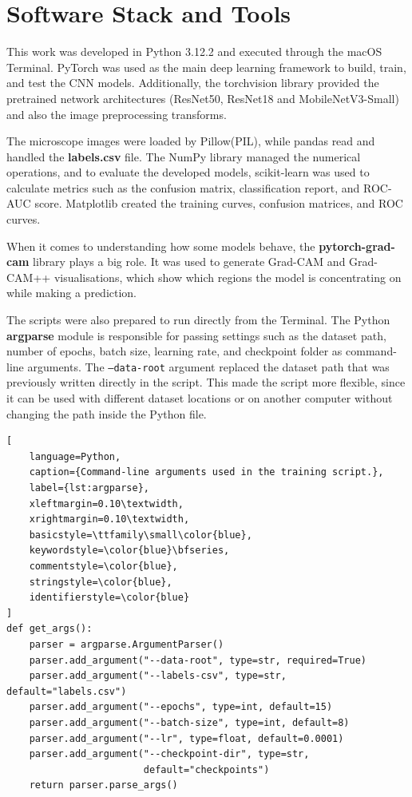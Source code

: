 \section{Software Stack and Tools}

This work was developed in Python 3.12.2 and executed through the macOS Terminal. PyTorch was used as the main deep learning framework to build, train, and test the CNN models. Additionally, the torchvision library provided the pretrained network architectures (ResNet50, ResNet18 and MobileNetV3-Small) and also the image preprocessing transforms.

The microscope images were loaded by Pillow(PIL), while pandas read and handled the \textbf{labels.csv} file. The NumPy library managed the numerical operations, and to evaluate the developed models, scikit-learn was used to calculate metrics such as the confusion matrix, classification report, and ROC-AUC score. Matplotlib created the training curves, confusion matrices, and ROC curves.

When it comes to understanding how some models behave, the \textbf{pytorch-grad-cam} library plays a big role. It was used to generate Grad-CAM and Grad-CAM++ visualisations, which show which regions the model is concentrating on while making a prediction.

The scripts were also prepared to run directly from the Terminal. The Python \textbf{argparse} module is responsible for passing settings such as the dataset path, number of epochs, batch size, learning rate, and checkpoint folder as command-line arguments. The \texttt{--data-root} argument replaced the dataset path that was previously written directly in the script. This made the script more flexible, since it can be used with different dataset locations or on another computer without changing the path inside the Python file.

\begin{lstlisting}[
    language=Python,
    caption={Command-line arguments used in the training script.},
    label={lst:argparse},
    xleftmargin=0.10\textwidth,
    xrightmargin=0.10\textwidth,
    basicstyle=\ttfamily\small\color{blue},
    keywordstyle=\color{blue}\bfseries,
    commentstyle=\color{blue},
    stringstyle=\color{blue},
    identifierstyle=\color{blue}
]
def get_args():
    parser = argparse.ArgumentParser()
    parser.add_argument("--data-root", type=str, required=True)
    parser.add_argument("--labels-csv", type=str, default="labels.csv")
    parser.add_argument("--epochs", type=int, default=15)
    parser.add_argument("--batch-size", type=int, default=8)
    parser.add_argument("--lr", type=float, default=0.0001)
    parser.add_argument("--checkpoint-dir", type=str,
                        default="checkpoints")
    return parser.parse_args()
\end{lstlisting}


